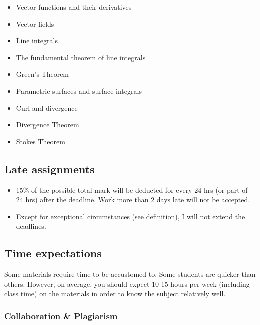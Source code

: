 \documentclass[
]{article}
\providecommand{\tightlist}{%
  \setlength{\itemsep}{0pt}\setlength{\parskip}{0pt}}
\begin{document}
\begin{itemize}
\tightlist
\item
  Vector functions and their derivatives
\item
  Vector fields
\item
  Line integrals
\item
  The fundamental theorem of line integrals
\item
  Green's Theorem
\item
  Parametric surfaces and surface integrals
\item
  Curl and divergence
\item
  Divergence Theorem
\item
  Stokes Theorem
\end{itemize}

\hypertarget{late-assignments}{%
\subsection*{Late assignments}\label{late-assignments}}

\begin{itemize}
\tightlist
\item
  15\% of the possible total mark will be deducted for every 24 hrs (or part of 24 hrs) after the
  deadline. Work more than 2 days late will not be accepted.
\item
  Except for exceptional circumstances (see \href{https://onestop.fulbright.edu.vn/s/article/Exceptional-Circumstance}{definition}),
  I will not extend the deadlines.
\end{itemize}

\hypertarget{time-expectations}{%
\subsection*{Time expectations}\label{time-expectations}}

Some materials require time to be accustomed to. Some students are quicker than
others. However, on average, you should expect 10-15 hours per week (including class time)
on the materials in order to know the subject relatively well.

\hypertarget{collaboration-plagiarism}{%
\subsubsection*{Collaboration \& Plagiarism}\label{collaboration-plagiarism}}
\end{document}
